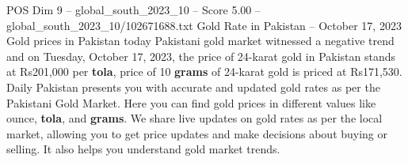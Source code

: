 \begin{textsample}{POS Dim 9 – global\_south\_2023\_10 – Score 5.00 – global\_south\_2023\_10/102671688.txt}
Gold Rate in Pakistan -- October 17, 2023 Gold prices in Pakistan today Pakistani gold market witnessed a negative trend and on Tuesday, October 17, 2023, the price of 24-karat gold in Pakistan stands at Rs201,000 per \textbf{tola}, price of 10 \textbf{grams} of 24-karat gold is priced at Rs171,530.
Daily Pakistan presents you with accurate and updated gold rates as per the Pakistani Gold Market.
Here you can find gold prices in different values like ounce, \textbf{tola}, and \textbf{grams}.
We share live updates on gold rates as per the local market, allowing you to get price updates and make decisions about buying or selling.
It also helps you understand gold market trends.

\end{textsample}

